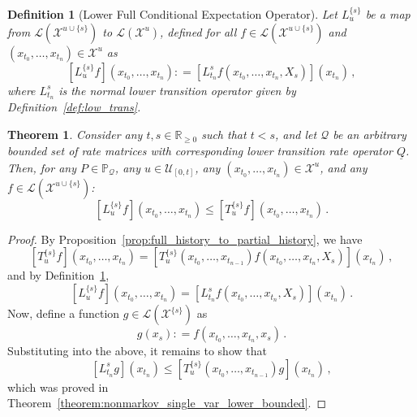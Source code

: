 \documentclass[10pt]{paper}
\newtheorem{theorem}{Theorem}
\newtheorem{definition}{Definition}
\newcommand{\reals}{\mathbb{R}}
\newcommand{\realsnonneg}{\reals_{\geq 0}}
\newcommand{\states}{\mathcal{X}}
\newcommand{\gambles}{\mathcal{L}}
\newcommand{\lrate}{\underline{Q}}
\newcommand{\coloneqq}{:\!=}
\begin{document}

\begin{definition}[Lower Full Conditional Expectation Operator]\label{def:low_full_cond_exp_op}
Let $L_u^{\{s\}}$ be a map from $\gambles(\states^{u\cup\{s\}})$ to $\gambles(\states^u)$, defined for all $f\in\gambles(\states^{u\cup\{s\}})$ and $(x_{t_0},\ldots,x_{t_n})\in\states^u$ as
\begin{equation*}
\left[L_u^{\{s\}}f\right](x_{t_0},\ldots,x_{t_n}) \coloneqq \left[L_{t_n}^s f(x_{t_0},\ldots,x_{t_{n}},X_s)\right](x_{t_n})\,,
\end{equation*}
where $L_{t_n}^s$ is the normal lower transition operator given by Definition~\ref{def:low_trans}.
\end{definition}

\begin{theorem}\label{theorem:nonmarkov_historic_variable_lower_bounded}
Consider any $t,s\in\realsnonneg$ such that $t<s$, and let $\mathcal{Q}$ be an arbitrary bounded set of rate matrices with corresponding lower transition rate operator $\lrate$. Then, for any $P\in\mathbb{P}_\mathcal{Q}$, any $u\in\mathcal{U}_{[0,t]}$, any $(x_{t_0},\ldots,x_{t_n})\in\states^u$, and any $f\in\gambles(\states^{u\cup\{s\}})$:
\begin{equation*}
\left[L_u^{\{s\}}f\right](x_{t_0},\ldots,x_{t_n}) \leq \left[T_u^{\{s\}}f\right](x_{t_0},\ldots,x_{t_n})\,.
\end{equation*}
\end{theorem}
\begin{proof}
By Proposition~\ref{prop:full_history_to_partial_history}, we have
\begin{equation*}
\left[T_u^{\{s\}}f\right](x_{t_0},\ldots,x_{t_n}) = \left[T_u^{\{s\}}(x_{t_0},\ldots,x_{t_{n-1}})f(x_{t_0},\ldots,x_{t_n},X_s)\right](x_{t_n})\,,
\end{equation*}
and by Definition~\ref{def:low_full_cond_exp_op},
\begin{equation*}
\left[L_u^{\{s\}}f\right](x_{t_0},\ldots,x_{t_n}) = \left[L_{t_n}^s f(x_{t_0},\ldots,x_{t_{n}},X_s)\right](x_{t_n})\,.
\end{equation*}
Now, define a function $g\in\gambles(\states^{\{s\}})$ as
\begin{equation*}
g(x_s) \coloneqq f(x_{t_0},\ldots,x_{t_n},x_s)\,.
\end{equation*}
Substituting into the above, it remains to show that
\begin{equation*}
\left[L_{t_n}^s g\right](x_{t_n}) \leq \left[T_u^{\{s\}}(x_{t_0},\ldots,x_{t_{n-1}})g\right](x_{t_n})\,,
\end{equation*}
which was proved in Theorem~\ref{theorem:nonmarkov_single_var_lower_bounded}.
\end{proof}
\end{document}
